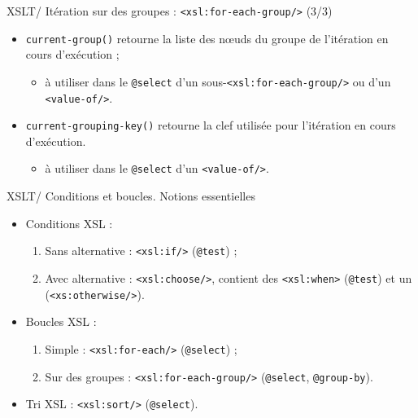 \documentclass{beamer}
\begin{document}
    \begin{frame}{XSLT/ Itération sur des groupes : \texttt{<xsl:for-each-group/>} (3/3)}
        \Large
        \begin{itemize}
            \item \texttt{current-group()} retourne la liste des nœuds du groupe de l'itération en cours d'exécution ;
            \begin{itemize}
            \large
                \item à utiliser dans le \texttt{@select} d'un sous-\texttt{<xsl:for-each-group/>} ou d'un \texttt{<value-of/>}.
            \end{itemize}
            \bigskip
            \item \texttt{current-grouping-key()} retourne la clef utilisée pour l'itération en cours d'exécution.
            \begin{itemize}
            \large
                \item à utiliser dans le \texttt{@select} d'un \texttt{<value-of/>}.
            \end{itemize}
        \end{itemize}
    \end{frame}

    \begin{frame}{XSLT/ Conditions et boucles. Notions essentielles}
        \Large
        \begin{itemize}
            \item Conditions XSL :
            \begin{enumerate}
            \large
                \item Sans alternative : \texttt{<xsl:if/>} (\texttt{@test}) ;
                \item Avec alternative : \texttt{<xsl:choose/>}, contient des \texttt{<xsl:when>} (\texttt{@test}) et un (\texttt{<xs:otherwise/>}).
            \end{enumerate}
            \bigskip
            \item Boucles XSL :
            \begin{enumerate}
            \large
                \item Simple : \texttt{<xsl:for-each/>} (\texttt{@select}) ;
                \item Sur des groupes : \texttt{<xsl:for-each-group/>} (\texttt{@select}, \texttt{@group-by}).
            \end{enumerate}
            \bigskip
            \item Tri XSL : \texttt{<xsl:sort/>} (\texttt{@select}).
        \end{itemize}
    \end{frame}
\end{document}
